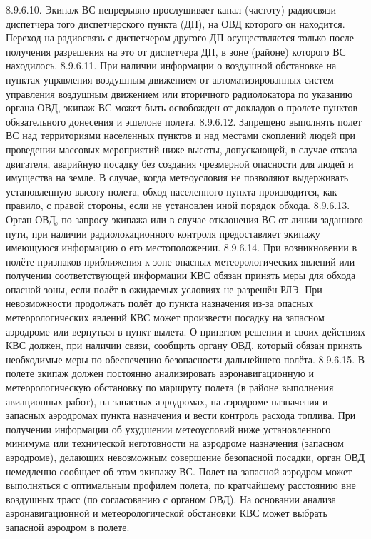 8.9.6.10. Экипаж ВС непрерывно прослушивает канал (частоту) радиосвязи диспетчера того диспетчерского пункта (ДП), на ОВД которого он находится. Переход на радиосвязь с диспетчером другого ДП осуществляется только после получения разрешения на это от диспетчера ДП, в зоне (районе) которого ВС находилось. 
8.9.6.11. При наличии информации о воздушной обстановке на пунктах управления воздушным движением от автоматизированных систем управления воздушным движением или вторичного радиолокатора по указанию органа ОВД, экипаж ВС может быть освобожден от докладов о пролете пунктов обязательного донесения и эшелоне полета. 
8.9.6.12. Запрещено выполнять полет ВС над территориями населенных пунктов и над местами скоплений людей при проведении массовых мероприятий ниже высоты, допускающей, в случае отказа двигателя, аварийную посадку без создания чрезмерной опасности для людей и имущества на земле. 
В случае, когда метеоусловия не позволяют выдерживать установленную высоту полета, обход населенного пункта производится, как правило, с правой стороны, если не установлен иной порядок обхода.
8.9.6.13. Орган ОВД, по запросу экипажа или в случае отклонения ВС от линии заданного пути, при наличии радиолокационного контроля предоставляет экипажу имеющуюся информацию о его местоположении.
8.9.6.14. При возникновении в полёте признаков приближения к зоне опасных метеорологических явлений или получении соответствующей информации КВС обязан принять меры для обхода опасной зоны, если полёт в ожидаемых условиях не разрешён РЛЭ. При невозможности продолжать полёт до пункта назначения из-за опасных метеорологических явлений КВС может произвести посадку на запасном аэродроме или вернуться в пункт вылета. О принятом решении и своих действиях КВС должен, при наличии связи, сообщить органу ОВД, который обязан принять необходимые меры по обеспечению безопасности дальнейшего полёта. 
8.9.6.15. В полете экипаж должен постоянно анализировать аэронавигационную и метеорологическую обстановку по маршруту полета (в районе выполнения авиационных работ), на запасных аэродромах, на аэродроме назначения и запасных аэродромах пункта назначения и вести контроль расхода топлива.
При получении информации об ухудшении метеоусловий ниже установленного минимума или технической неготовности на аэродроме назначения (запасном аэродроме), делающих невозможным совершение безопасной посадки, орган ОВД немедленно сообщает об этом экипажу ВС.
Полет на запасной аэродром может выполняться с оптимальным профилем полета, по кратчайшему расстоянию вне воздушных трасс (по согласованию с органом ОВД). 
На основании анализа аэронавигационной и метеорологической обстановки КВС может выбрать запасной аэродром в полете. 
